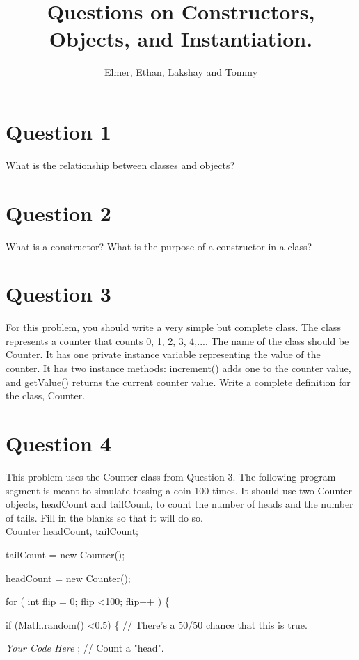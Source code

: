 \documentclass[11pt, oneside]{article}   	%
\title{Questions on Constructors, Objects, and Instantiation.}
\author{Elmer, Ethan, Lakshay and Tommy}
\date{}							%
\begin{document}
\maketitle
\section*{Question 1}
What is the relationship between classes and objects?

\section*{Question 2}
What is a constructor? What is the purpose of a constructor in a class?

\section*{Question 3}
For this problem, you should write a very simple but complete class. The class represents a counter that counts 0, 1, 2, 3, 4,.... The name of the class should be Counter. It has one private instance variable representing the value of the counter. It has two instance methods: increment() adds one to the counter value, and getValue() returns the current counter value. Write a complete definition for the class, Counter.

\section*{Question 4}
\par
This problem uses the Counter class from Question 3. The following program segment is meant to simulate tossing a coin 100 times. It should use two Counter objects, headCount and tailCount, to count the number of heads and the number of tails. Fill in the blanks so that it will do so.\\ 

Counter headCount, tailCount;

tailCount = new Counter();

headCount = new Counter();

for ( int flip = 0;  flip \textless 100;  flip++ ) \{

\hspace{4ex} if (Math.random() \textless 0.5) \{   // There's a 50/50 chance that this is true.
             
\hspace{8ex} \textit{Your Code Here} ;   // Count a "head".
\end{document}
